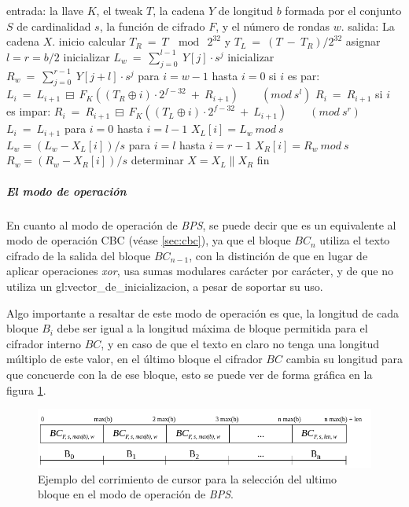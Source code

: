 \begin{pseudocodigo}[caption={Proceso de descifrado $BC^{-1}$.}, 
label={descifrado_BC}]
  entrada:    la llave $K$, el tweak $T$, la cadena $Y$ de longitud $b$ formada por el conjunto $S$ 
              de cardinalidad $s$, la función de cifrado $F$, y el número de rondas $w$. 
  salida:     La cadena $X$.
  inicio
    calcular $T_R\: =\: T\: \mod\: 2^{32}$ y $T_L\: =\: (T\: -\: T_R) / 2^{32}$
    asignar $l = r = b/2$
    inicializar $L_w\: =\: \sum_{j=0}^{l-1}\: Y[j] \cdot s^j$
    inicializar $R_w\: =\: \sum_{j=0}^{r-1}\: Y[j+l] \cdot s^j$
    para $i=w-1$ hasta $i=0$
    si $i$ es par:
      $L_i\: =\: L_{i+1}\: \boxminus\: F_K((T_R \oplus i) \cdot 2^{f-32}\: +\: R_{i+1})\qquad (mod\ s^l)$
      $R_i\: =\: R_{i+1}$
    si $i$ es impar:
      $R_i\: =\: R_{i+1}\: \boxminus\: F_K((T_L \oplus i) \cdot 2^{f-32}\: +\: L_{i+1})\qquad (mod\ s^r)$
      $L_i\: =\: L_{i+1}$
    para $i=0$ hasta $i=l-1$
      $X_L[i] = L_w\ mod\ s$
      $L_w = (L_w - X_L[i])/s$
    para $i=l$ hasta $i=r-1$
      $X_R[i] = R_w\ mod\ s$
      $R_w = (R_w - X_R[i])/s$
    determinar $X = X_L \parallel X_R$
  fin
\end{pseudocodigo}


\subparagraph{El modo de operación}

En cuanto al modo de operación de \textit{BPS}, se puede decir que es un 
equivalente al modo de operación CBC (véase \ref{sec:cbc}), ya que el bloque 
$BC_n$ utiliza el texto cifrado de la salida del bloque $BC_{n-1}$, con la 
distinción de que en lugar de aplicar operaciones \textit{xor}, usa sumas 
modulares carácter por carácter, y de que no utiliza un 
\gls{gl:vector_de_inicializacion}, a pesar de soportar su uso.

Algo importante a resaltar de este modo de operación es que, la longitud de 
cada bloque $B_i$ debe ser igual a la longitud máxima de bloque permitida 
para el cifrador interno $BC$, y en caso de que el texto en claro no tenga 
una longitud múltiplo de este valor, en el último bloque el cifrador $BC$ 
cambia su longitud para que concuerde con la de ese bloque, esto se puede 
ver de forma gráfica en la figura \ref{cursor_BPS}.

\begin{figure}[H]
  \begin{center}
    \includegraphics[width=0.9\linewidth]
    {../../../../../../diagramas_comunes/bps/cursor_bps}
    \caption{Ejemplo del corrimiento de cursor para la selección del ultimo 
      bloque en el modo de operación de \textit{BPS}.}
    \label{cursor_BPS}
   \end{center}
\end{figure}

